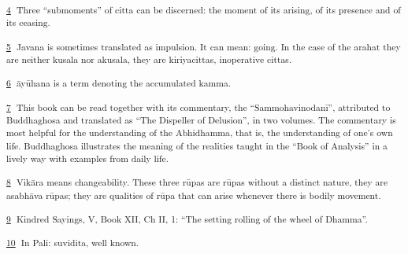 \hypertarget{sdfootnote4}{}
\textsuperscript{\protect\hyperlink{sdfootnote4anc}{4} \textdutch{Three
``submoments'' of citta can be discerned: the moment of its arising, of
its presence and of its ceasing. }}

\hypertarget{sdfootnote5}{}
\textsuperscript{\protect\hyperlink{sdfootnote5anc}{5}
\textdutch{Javana is sometimes translated as impulsion. It can mean:
going. In the case of the arahat they are neither kusala nor akusala,
they are kiriyacittas, inoperative cittas. }}

\hypertarget{sdfootnote6}{}
\textsuperscript{\protect\hyperlink{sdfootnote6anc}{6}
\textdutch{āyūhana is a term denoting the accumulated kamma. }}

\hypertarget{sdfootnote7}{}
\textsuperscript{\protect\hyperlink{sdfootnote7anc}{7}
\textenglish[variant=american]{This book can be read together with its
commentary, the
}``\textenglish[variant=american]{Sammohavinodan}ī''\textenglish[variant=american]{,
attributed to Buddhaghosa and translated as
}``\textenglish[variant=american]{The Dispeller of
Delusion}''\textenglish[variant=american]{, in two volumes. The
commentary is most helpful for the understanding of the Abhidhamma, that
is, the understanding of one}'\textenglish[variant=american]{s own life.
Buddhaghosa illustrates the meaning of the realities taught in the
}``\textenglish[variant=american]{Book of Analysis}''
\textenglish[variant=american]{in a lively way with examples from daily
life. }}

\hypertarget{sdfootnote8}{}
\textsuperscript{\protect\hyperlink{sdfootnote8anc}{8}\textdutch{
Vikāra means changeability. }\textenglish[variant=american]{These three
r}ū\textenglish[variant=american]{pas are
r}ū\textenglish[variant=american]{pas without a distinct nature,
}\textdutch{they are }\textgerman{asabh}\textdanish{ā}va
rū\textenglish[variant=american]{pas; they are qualities of
r}ūpa\textdutch{ that can arise whenever there is bodily movement. }}

\hypertarget{sdfootnote9}{}
\textsuperscript{\protect\hyperlink{sdfootnote9anc}{9}\textdutch{
Kindred Sayings, V, Book XII, Ch II, 1: ``The setting rolling of the
wheel of Dhamma''.}}

\hypertarget{sdfootnote10}{}
\textsuperscript{\protect\hyperlink{sdfootnote10anc}{10} \textdutch{In
Pali: suvidita, well known. }}
